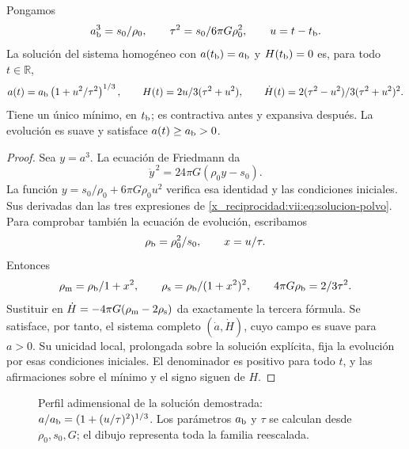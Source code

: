 \begin{theorem}
\label{x_reciprocidad:vii:thm:rebote-polvo}
Pongamos
\[
 a_{\rm b}^3=\frac{s_0}{\rho_0},\qquad
 \tau^2=\frac{s_0}{6\pi G\rho_0^2},\qquad u=t-t_{\rm b}.
\]
La solución del sistema homogéneo con
\(a(t_{\rm b})=a_{\rm b}\) y \(H(t_{\rm b})=0\) es, para todo
\(t\in\mathbb R\),
\begin{equation}
 a(t)=a_{\rm b}\left(1+\frac{u^2}{\tau^2}\right)^{1/3},
 \qquad H(t)=\frac{2u}{3(\tau^2+u^2)},\qquad
 \dot H(t)=\frac{2(\tau^2-u^2)}{3(\tau^2+u^2)^2}.
 \label{x_reciprocidad:vii:eq:solucion-polvo}
\end{equation}
Tiene un único mínimo, en \(t_{\rm b}\); es contractiva antes y
expansiva después. La evolución es suave y satisface
\(a(t)\geq a_{\rm b}>0\).
\end{theorem}
\begin{proof}
Sea \(y=a^3\). La ecuación de Friedmann da
\[
 \dot y^{\,2}=24\pi G(\rho_0y-s_0).
\]
La función \(y=s_0/\rho_0+6\pi G\rho_0u^2\) verifica esa
identidad y las condiciones iniciales. Sus derivadas dan las
tres expresiones de \eqref{x_reciprocidad:vii:eq:solucion-polvo}. Para comprobar
también la ecuación de evolución, escribamos
\[
 \rho_{\rm b}=\frac{\rho_0^2}{s_0},\qquad
 x=\frac{u}{\tau}.
\]
Entonces
\[
 \rho_{\rm m}=\frac{\rho_{\rm b}}{1+x^2},\qquad
 \rho_{\rm s}=\frac{\rho_{\rm b}}{(1+x^2)^2},\qquad
 4\pi G\rho_{\rm b}=\frac{2}{3\tau^2}.
\]
Sustituir en \(\dot H=-4\pi G(\rho_{\rm m}-2\rho_{\rm s})\)
da exactamente la tercera fórmula. Se satisface, por tanto,
el sistema completo \((\dot a,\dot H)\), cuyo campo es suave
para \(a>0\). Su unicidad local, prolongada sobre la solución
explícita, fija la evolución por esas condiciones iniciales.
El denominador es positivo para todo \(t\), y las afirmaciones
sobre el mínimo y el signo siguen de \(H\).
\end{proof}

\begin{figure}[htbp]
\centering
{}
\caption{Perfil adimensional de la solución demostrada:
\(a/a_{\rm b}=(1+(u/\tau)^2)^{1/3}\).
Los parámetros \(a_{\rm b}\) y \(\tau\) se calculan desde
\(\rho_0,s_0,G\); el dibujo representa toda la familia reescalada.}
\label{x_reciprocidad:vii:fig:rebote-polvo}
\end{figure}


